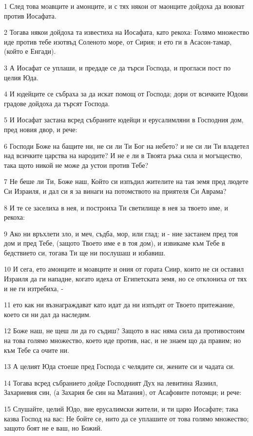 \par 1 След това моавците и амонците, и с тях някои от маонците дойдоха да воюват против Иосафата.
\par 2 Тогава някои дойдоха та известиха на Иосафата, като рекоха: Голямо множество иде против тебе изотвъд Соленото море, от Сирия; и ето ги в Асасон-тамар, (който е Енгади).
\par 3 А Иосафат се уплаши, и предаде се да търси Господа, и прогласи пост по целия Юда.
\par 4 И юдейците се събраха за да искат помощ от Господа; дори от всичките Юдови градове дойдоха да търсят Господа.
\par 5 И Иосафат застана всред събраните юдейци и ерусалимляни в Господния дом, пред новия двор, и рече:
\par 6 Господи Боже на бащите ни, не си ли Ти Бог на небето? и не си ли Ти владетел над всичките царства на народите? И не е ли в Твоята ръка сила и могъщество, така щото никой не може да устои против Тебе?
\par 7 Не беше ли Ти, Боже наш, Който си изпъдил жителите на тая земя пред людете Си Израиля, и дал си я за винаги на потомството на приятеля Си Аврама?
\par 8 И те се заселиха в нея, и построиха Ти светилище в нея за твоето име, и рекоха:
\par 9 Ако ни връхлети зло, и меч, съдба, мор, или глад; и - ние застанем пред тоя дом и пред Тебе, (защото Твоето име е в тоя дом), и извикаме към Тебе в бедствието си, тогава Ти ще ни послушаш и избавиш.
\par 10 И сега, ето амонците и моавците и ония от гората Сиир, които не си оставил Израиля да ги нападне, когато идеха от Египетската земя, но се отклониха от тях и не ги изтребиха, -
\par 11 ето как ни възнаграждават като идат да ни изпъдят от Твоето притежание, което си ни дал да наследим.
\par 12 Боже наш, не щеш ли да го съдиш? Защото в нас няма сила да противостоим на това голямо множество, което иде против, нас, и не знаем що да правим; но към Тебе са очите ни.
\par 13 А целият Юда стоеше пред Господа с челядите си, жените си и чадата си.
\par 14 Тогава всред събранието дойде Господният Дух на левитина Яазиил, Захариевия син, (а Захария бе син на Матания), от Асафовите потомци; и рече:
\par 15 Слушайте, целий Юдо, вие ерусалимски жители, и ти царю Иосафате; така казва Господ на вас: Не бойте се, нито да се уплашите от това голямо множество; защото боят не е ваш, но Божий.
